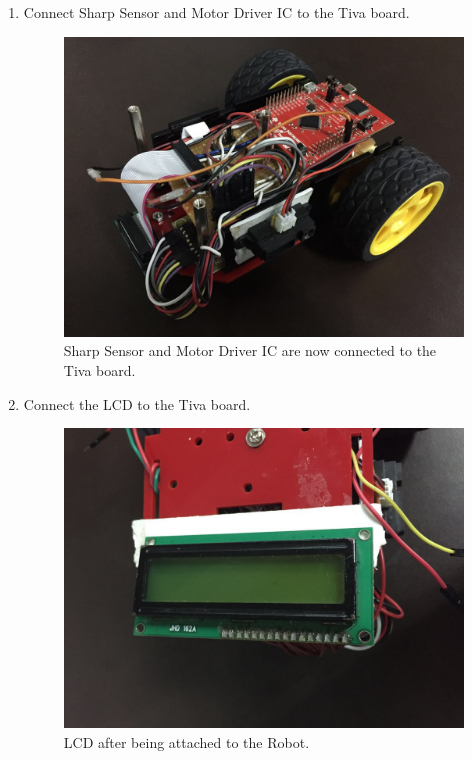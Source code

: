 \documentclass[a4paper,12pt,oneside]{book}
\begin{document}
\begin{enumerate}
\item Connect Sharp Sensor and Motor Driver IC to the Tiva board.
\begin{figure}[h]
        \centering
        \includegraphics[scale=0.16]{all_connected}
        \caption{Sharp Sensor and Motor Driver IC are now connected to the Tiva board.}
      \end{figure}
      \newpage

\item Connect the LCD to the Tiva board.
\begin{figure}[h]
        \centering
        \includegraphics[scale=0.16]{lcd_a}
        \caption{LCD after being attached to the Robot.}
      \end{figure}


\end{enumerate}
\end{document}
